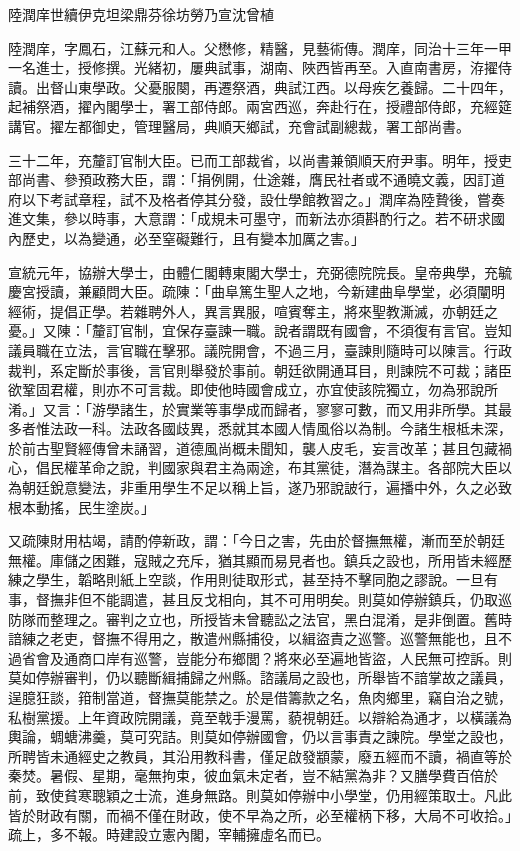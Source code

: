 
\begin{pinyinscope}
陸潤庠世續伊克坦梁鼎芬徐坊勞乃宣沈曾植

陸潤庠，字鳳石，江蘇元和人。父懋修，精醫，見藝術傳。潤庠，同治十三年一甲一名進士，授修撰。光緒初，屢典試事，湖南、陜西皆再至。入直南書房，洊擢侍讀。出督山東學政。父憂服闋，再遷祭酒，典試江西。以母疾乞養歸。二十四年，起補祭酒，擢內閣學士，署工部侍郎。兩宮西巡，奔赴行在，授禮部侍郎，充經筵講官。擢左都御史，管理醫局，典順天鄉試，充會試副總裁，署工部尚書。

三十二年，充釐訂官制大臣。已而工部裁省，以尚書兼領順天府尹事。明年，授吏部尚書、參預政務大臣，謂：「捐例開，仕途雜，膺民社者或不通曉文義，因訂道府以下考試章程，試不及格者停其分發，設仕學館教習之。」潤庠為陸贄後，嘗奏進文集，參以時事，大意謂：「成規未可墨守，而新法亦須斟酌行之。若不研求國內歷史，以為變通，必至窒礙難行，且有變本加厲之害。」

宣統元年，協辦大學士，由體仁閣轉東閣大學士，充弼德院院長。皇帝典學，充毓慶宮授讀，兼顧問大臣。疏陳：「曲阜篤生聖人之地，今新建曲阜學堂，必須闡明經術，提倡正學。若雜聘外人，異言異服，喧賓奪主，將來聖教澌滅，亦朝廷之憂。」又陳：「釐訂官制，宜保存臺諫一職。說者謂既有國會，不須復有言官。豈知議員職在立法，言官職在擊邪。議院開會，不過三月，臺諫則隨時可以陳言。行政裁判，系定斷於事後，言官則舉發於事前。朝廷欲開通耳目，則諫院不可裁；諸臣欲鞏固君權，則亦不可言裁。即使他時國會成立，亦宜使該院獨立，勿為邪說所淆。」又言：「游學諸生，於實業等事學成而歸者，寥寥可數，而又用非所學。其最多者惟法政一科。法政各國歧異，悉就其本國人情風俗以為制。今諸生根柢未深，於前古聖賢經傳曾未誦習，道德風尚概未聞知，襲人皮毛，妄言改革；甚且包藏禍心，倡民權革命之說，判國家與君主為兩途，布其黨徒，潛為謀主。各部院大臣以為朝廷銳意變法，非重用學生不足以稱上旨，遂乃邪說詖行，遍播中外，久之必致根本動搖，民生塗炭。」

又疏陳財用枯竭，請酌停新政，謂：「今日之害，先由於督撫無權，漸而至於朝廷無權。庫儲之困難，寇賊之充斥，猶其顯而易見者也。鎮兵之設也，所用皆未經歷練之學生，韜略則紙上空談，作用則徒取形式，甚至持不擊同胞之謬說。一旦有事，督撫非但不能調遣，甚且反戈相向，其不可用明矣。則莫如停辦鎮兵，仍取巡防隊而整理之。審判之立也，所授皆未曾聽訟之法官，黑白混淆，是非倒置。舊時諳練之老吏，督撫不得用之，散遣州縣捕役，以緝盜責之巡警。巡警無能也，且不過省會及通商口岸有巡警，豈能分布鄉閭？將來必至遍地皆盜，人民無可控訴。則莫如停辦審判，仍以聽斷緝捕歸之州縣。諮議局之設也，所舉皆不諳掌故之議員，逞臆狂談，箝制當道，督撫莫能禁之。於是借籌款之名，魚肉鄉里，竊自治之號，私樹黨援。上年資政院開議，竟至戟手漫罵，藐視朝廷。以辯給為通才，以橫議為輿論，蜩螗沸羹，莫可究詰。則莫如停辦國會，仍以言事責之諫院。學堂之設也，所聘皆未通經史之教員，其沿用教科書，僅足啟發顓蒙，廢五經而不讀，禍直等於秦焚。暑假、星期，毫無拘束，彼血氣未定者，豈不結黨為非？又膳學費百倍於前，致使貧寒聰穎之士流，進身無路。則莫如停辦中小學堂，仍用經策取士。凡此皆於財政有關，而禍不僅在財政，使不早為之所，必至權柄下移，大局不可收拾。」疏上，多不報。時建設立憲內閣，宰輔擁虛名而已。


\end{pinyinscope}
